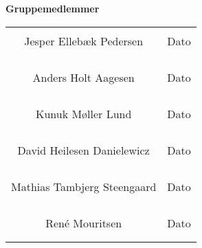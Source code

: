 
%
\phantom{Luft}
\textbf{Gruppemedlemmer}
\phantom{Luft}

\phantom{Luft}
\phantom{Luft}
\phantom{Luft}
\phantom{Luft}
\begin{table}[H]
	\centering
		\begin{tabular}{c c }
			\underline{\phantom{mmmmmmmmmmmmmmmmmmm}} & \underline{\phantom{mmmmmmm}} \\
			Jesper Ellebæk Pedersen		& Dato	\\
			& \\
			& \\
			& \\
			\underline{\phantom{mmmmmmmmmmmmmmmmmmm}} & \underline{\phantom{mmmmmmm}} \\
			Anders Holt Aagesen & Dato	 \\		
			& \\
			& \\
			& \\
			\underline{\phantom{mmmmmmmmmmmmmmmmmmm}} & \underline{\phantom{mmmmmmm}} \\
			
			Kunuk Møller Lund & Dato	 \\			
			& \\
			& \\
			& \\
			\underline{\phantom{mmmmmmmmmmmmmmmmmmm}} & \underline{\phantom{mmmmmmm}} \\ 
			David Heilesen Danielewicz	& Dato	 \\	
			
			& \\
			& \\
			& \\
			\underline{\phantom{mmmmmmmmmmmmmmmmmmm}} & \underline{\phantom{mmmmmmm}} \\ 
			Mathias Tambjerg Steengaard & Dato	 \\	
			 	
			& \\
			& \\
			& \\
			\underline{\phantom{mmmmmmmmmmmmmmmmmmm}} & \underline{\phantom{mmmmmmm}} \\  
			René Mouritsen 	& Dato	 \\			
			& \\
			& \\
		 															
															
		\end{tabular}
\end{table}
